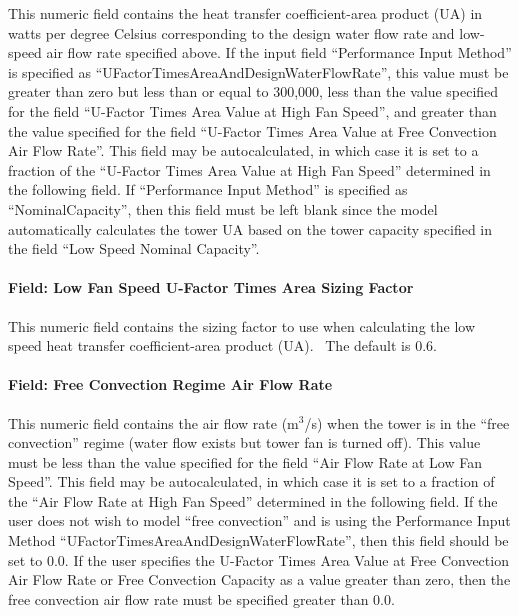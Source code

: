 This numeric field contains the heat transfer coefficient-area product (UA) in watts per degree Celsius corresponding to the design water flow rate and low-speed air flow rate specified above. If the input field ``Performance Input Method'' is specified as ``UFactorTimesAreaAndDesignWaterFlowRate'', this value must be greater than zero but less than or equal to 300,000, less than the value specified for the field ``U-Factor Times Area Value at High Fan Speed'', and greater than the value specified for the field ``U-Factor Times Area Value at Free Convection Air Flow Rate''. This field may be autocalculated, in which case it is set to a fraction of the ``U-Factor Times Area Value at High Fan Speed'' determined in the following field. If ``Performance Input Method'' is specified as ``NominalCapacity'', then this field must be left blank since the model automatically calculates the tower UA based on the tower capacity specified in the field ``Low Speed Nominal Capacity''.

\paragraph{Field: Low Fan Speed U-Factor Times Area Sizing Factor}\label{field-low-fan-speed-u-factor-times-area-sizing-factor}

This numeric field contains the sizing factor to use when calculating the low speed heat transfer coefficient-area product (UA).~ The default is 0.6.

\paragraph{Field: Free Convection Regime Air Flow Rate}\label{field-free-convection-regime-air-flow-rate}

This numeric field contains the air flow rate (m\(^{3}\)/s) when the tower is in the ``free convection'' regime (water flow exists but tower fan is turned off). This value must be less than the value specified for the field ``Air Flow Rate at Low Fan Speed''. This field may be autocalculated, in which case it is set to a fraction of the ``Air Flow Rate at High Fan Speed'' determined in the following field. If the user does not wish to model ``free convection'' and is using the Performance Input Method ``UFactorTimesAreaAndDesignWaterFlowRate'', then this field should be set to 0.0. If the user specifies the U-Factor Times Area Value at Free Convection Air Flow Rate or Free Convection Capacity as a value greater than zero, then the free convection air flow rate must be specified greater than 0.0.

